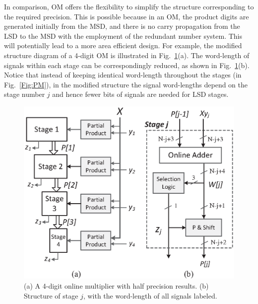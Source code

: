 In comparison, OM offers the flexibility to simplify the structure corresponding to the required precision. This is possible because in an OM, the product digits are generated initially from the MSD, and there is no carry propagation from the LSD to the MSD with the employment of the redundant number system. This will potentially lead to a more area efficient design. For example, the modified structure diagram of a 4-digit OM is illustrated in Fig.~\ref{Fig:PM_half}(a). The word-length of signals within each stage can be correspondingly reduced, as shown in Fig.~\ref{Fig:PM_half}(b). Notice that instead of keeping identical word-length throughout the stages (in Fig.~\ref{Fig:PM}), in the modified structure the signal word-lengths depend on the stage number $j$ and hence fewer bits of signals are needed for LSD stages.

\begin{figure}[tbp]
  \centering
  \includegraphics[width=.42\textwidth]{./figures/ParallelMult_MSDhalf.eps}
  \caption{(a) A 4-digit online multiplier with half precision results. (b) Structure of stage $j$, with the word-length of all signals labeled.}
    \vspace{-2ex}
  \label{Fig:PM_half}
\end{figure}
